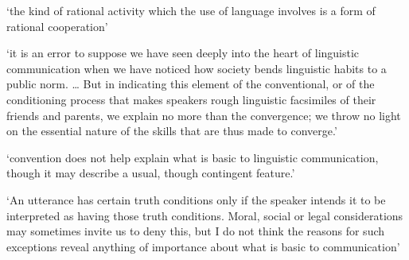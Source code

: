 \documentclass[12pt]{extarticle}
\begin{document}
\begin{multicols}{3}
‘the kind of rational activity which the use of language involves is a form of rational cooperation’
\citep[p.\ 341]{Grice:1989ha}
 
‘it is an error to suppose we have seen deeply into the heart of linguistic communication when we have noticed how society bends linguistic habits to a public norm. … But in indicating this element of the conventional, or of the conditioning process that makes speakers rough linguistic facsimiles of their friends and parents, we explain no more than the convergence; we throw no light on the essential nature of the skills that are thus made to converge.’
\citep[p.\ 278]{Davidson:1982uu}
 
‘convention does not help explain what is basic to linguistic communication, though it may describe a usual, though contingent feature.’
\citep[p.\ 280]{Davidson:1982uu}
 
‘An utterance has certain truth conditions only if the speaker intends it to be interpreted as having those truth conditions. Moral, social or legal considerations may sometimes invite us to deny this, but I do not think the reasons for such exceptions reveal anything of importance about what is basic to communication’
\citep[p.\ 310]{Davidson:1990du}
 


 
 
 
\footnotesize 


\end{multicols}
\end{document}
